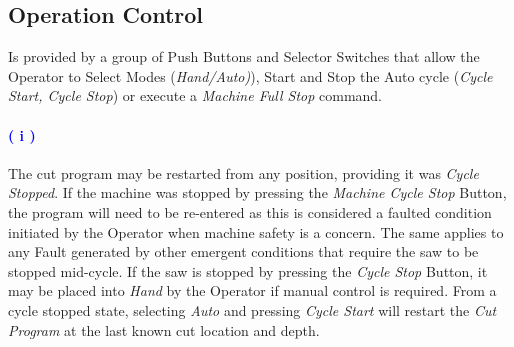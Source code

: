 \subsection{Operation Control} Is provided by a group of Push Buttons and Selector Switches that allow the Operator to Select Modes (\textit{Hand/Auto)}), Start and Stop the Auto cycle (\textit{Cycle Start, Cycle Stop}) or execute a \textit{Machine Full Stop} command. 
\paragraph{\textbf{\LARGE \textcolor{blue}{( i )}}}The cut program may be restarted from any position, providing it was \textit{Cycle Stopped}. If the machine was stopped by pressing the \textit{Machine Cycle Stop} Button, the program will need to be re-entered as this is considered a faulted condition initiated by the Operator when machine safety is a concern. The same applies to any Fault generated by other emergent conditions that require the saw to be stopped mid-cycle. If the saw is stopped by pressing the \textit{Cycle Stop} Button, it may be placed into \textit{Hand} by the Operator if manual control is required. From a cycle stopped state, selecting \textit{Auto} and pressing \textit{Cycle Start} will restart the \textit{Cut Program} at the last known cut location and depth.
